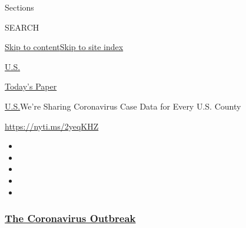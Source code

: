 Sections

SEARCH

\protect\hyperlink{site-content}{Skip to
content}\protect\hyperlink{site-index}{Skip to site index}

\href{https://www.nytimes3xbfgragh.onion/section/us}{U.S.}

\href{https://myaccount.nytimes3xbfgragh.onion/auth/login?response_type=cookie\&client_id=vi}{}

\href{https://www.nytimes3xbfgragh.onion/section/todayspaper}{Today's
Paper}

\href{/section/us}{U.S.}\textbar{}We're Sharing Coronavirus Case Data
for Every U.S. County

\url{https://nyti.ms/2yeqKHZ}

\begin{itemize}
\item
\item
\item
\item
\item
\end{itemize}

\hypertarget{the-coronavirus-outbreak}{%
\subsubsection{\texorpdfstring{\href{https://www.nytimes3xbfgragh.onion/news-event/coronavirus?name=styln-coronavirus-national\&region=TOP_BANNER\&block=storyline_menu_recirc\&action=click\&pgtype=Article\&impression_id=606bee20-f4b7-11ea-ab3e-6b17423f7877\&variant=undefined}{The
Coronavirus
Outbreak}}{The Coronavirus Outbreak}}\label{the-coronavirus-outbreak}}

